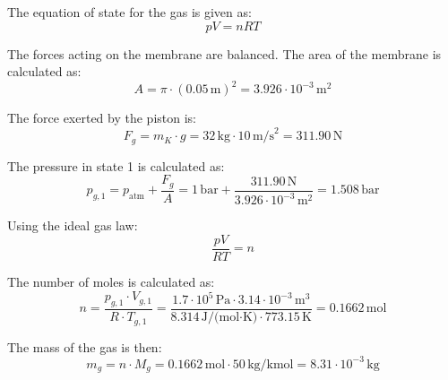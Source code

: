 The equation of state for the gas is given as:  
\[
pV = nRT
\]  

The forces acting on the membrane are balanced. The area of the membrane is calculated as:  
\[
A = \pi \cdot (0.05 \, \text{m})^2 = 3.926 \cdot 10^{-3} \, \text{m}^2
\]  

The force exerted by the piston is:  
\[
F_g = m_K \cdot g = 32 \, \text{kg} \cdot 10 \, \text{m/s}^2 = 311.90 \, \text{N}
\]  

The pressure in state 1 is calculated as:  
\[
p_{g,1} = p_{\text{atm}} + \frac{F_g}{A} = 1 \, \text{bar} + \frac{311.90 \, \text{N}}{3.926 \cdot 10^{-3} \, \text{m}^2} = 1.508 \, \text{bar}
\]  

Using the ideal gas law:  
\[
\frac{pV}{RT} = n
\]  

The number of moles is calculated as:  
\[
n = \frac{p_{g,1} \cdot V_{g,1}}{R \cdot T_{g,1}} = \frac{1.7 \cdot 10^5 \, \text{Pa} \cdot 3.14 \cdot 10^{-3} \, \text{m}^3}{8.314 \, \text{J/(mol·K)} \cdot 773.15 \, \text{K}} = 0.1662 \, \text{mol}
\]  

The mass of the gas is then:  
\[
m_g = n \cdot M_g = 0.1662 \, \text{mol} \cdot 50 \, \text{kg/kmol} = 8.31 \cdot 10^{-3} \, \text{kg}
\]